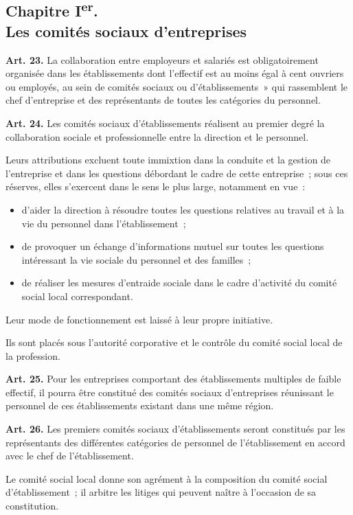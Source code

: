 \documentclass[french,twoside]{book} %
\newcommand{\labelchar}[1]{\textbf{\color{rubric} #1}}
\begin{document}
\subsection[{Chapitre Ier. Les comités sociaux d’entreprises}]{Chapitre I\textsuperscript{er}. \\
Les comités sociaux d’entreprises}

\noindent \labelchar{Art. 23.} La collaboration entre employeurs et salariés est obligatoirement organisée dans les établissements dont l’effectif est au moins égal à cent ouvriers ou employés, au sein de comités sociaux ou d’établissements » qui rassemblent le chef d’entreprise et des représentants de toutes les catégories du personnel.\par
\bigbreak
\noindent \labelchar{Art. 24.} Les comités sociaux d’établissements réalisent au premier degré la collaboration sociale et professionnelle entre la direction et le personnel.\par
Leurs attributions excluent toute immixtion dans la conduite et la gestion de l’entreprise et dans les questions débordant le cadre de cette entreprise ; sous ces réserves, elles s’exercent dans le sens le plus large, notamment en vue :\par

\begin{itemize}[itemsep=0pt,]
\item d’aider la direction à résoudre toutes les questions relatives au travail et à la vie du personnel dans l’établissement ;
\item de provoquer un échange d’informations mutuel sur toutes les questions intéressant la vie sociale du personnel et des familles ;
\item de réaliser les mesures d’entraide sociale dans le cadre d’activité du comité social local correspondant.
\end{itemize}

\noindent Leur mode de fonctionnement est laissé à leur propre initiative.\par
Ils sont placés sous l’autorité corporative et le contrôle du comité social local de la profession.\par
\bigbreak
\noindent \labelchar{Art. 25.} Pour les entreprises comportant des établissements multiples de faible effectif, il pourra être constitué des comités sociaux d’entreprises réunissant le personnel de ces établissements existant dans une même région.\par
\bigbreak
\noindent \labelchar{Art. 26.} Les premiers comités sociaux d’établissements seront constitués par les représentants des différentes catégories de personnel de l’établissement en accord avec le chef de l’établissement.\par
Le comité social local donne son agrément à la composition du comité social d’établissement ; il arbitre les litiges qui peuvent naître à l’occasion de sa constitution.
\end{document}
